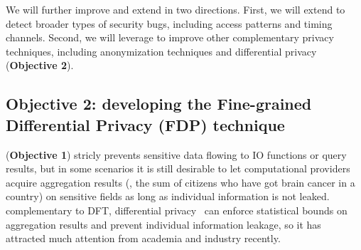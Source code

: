 




 We will further improve and extend \kakute in 
two directions. First, we will extend \kakute to detect broader types of
security bugs, including access patterns and timing channels. Second, we will 
leverage \kakute to improve other complementary privacy techniques, including 
anonymization techniques and differential privacy (\textbf{Objective 2}). 

\vspace{-.15in}\subsection{Objective 2: developing the Fine-grained 
Differential Privacy (FDP) technique}\label{sec:obj2}\vspace{-.075in}



\kakute (\textbf{Objective 1}) stricly prevents
sensitive data flowing to IO functions or query results, but in some scenarios 
it is still desirable to let computational providers acquire aggregation 
results (\eg, the sum of citizens who have got brain cancer in a country) 
on sensitive fields as long as individual information is not leaked. 
complementary to DFT, differential privacy~\cite{Dwork2006Differential, 
Dwork2008Differential, Dwork2011a} can enforce statistical bounds on 
aggregation results and prevent individual information leakage, so it has 
attracted much attention from academia and industry recently.


